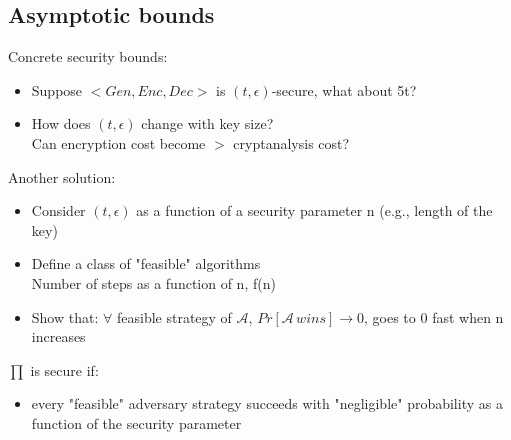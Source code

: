 \documentclass[12pt]{article}
\begin{document}
\subsection{Asymptotic bounds}
Concrete security bounds:
\begin{itemize}
\item Suppose $<Gen,Enc,Dec>$ is  $(t, \epsilon)$-secure, what about 5t?
\item How does  $(t, \epsilon)$ change with key size?\\
Can encryption cost become $>$ cryptanalysis cost?
\end{itemize}
Another solution:
\begin{itemize}
\item  Consider $(t, \epsilon)$ as a function of a security parameter n (e.g., length of the key)
\item Define a class of "feasible" algorithms\\
Number of steps as a function of n, f(n)
\item Show that: $\forall$ feasible strategy of $\mathcal{A}$, $Pr[\mathcal{A}\,wins ] \rightarrow 0$, goes to 0 fast when n increases
\end{itemize}
$\prod$ is secure if:
\begin{itemize}
\item every "feasible" adversary strategy succeeds with "negligible" probability as a function of the security parameter
\end{itemize}
\end{document}
